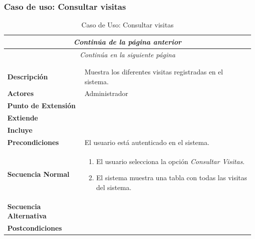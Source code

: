 \newpage
\subsubsection*{Caso de uso: Consultar visitas }
\begin{longtable}{| p{4cm} | p{10cm} |}
\endfirsthead
\multicolumn{2}{c}{\textit{Continúa de la página anterior}}\\[12pt]
\hline
\endhead
\hline
\multicolumn{2}{c}{\textit{Continúa en la siguiente página}} \\
\endfoot
\hline
\caption{Caso de Uso: Consultar visitas}\label{fig:1}\\
\endlastfoot


\hline
\multicolumn{2}{|c|}{\textbf{CU$<$31$>$ - Consultar Visitas}} \\

\hline
\textbf{Descripción} &
Muestra los diferentes visitas registradas en el sistema.\\

\hline
\textbf{Actores} &
Administrador\\

\hline
\textbf{Punto de Extensión} &
\\

\hline
\textbf{Extiende} &
\\

\hline
\textbf{Incluye} &
\\

\hline
\textbf{Precondiciones} &
El usuario está autenticado en el sistema.\\

\hline
\textbf{Secuencia Normal} &\mbox{}\par\vspace{-\baselineskip}
\begin{enumerate}[leftmargin=0.7cm, topsep=0.1cm]
\item El usuario selecciona la opción \textit{Consultar Visitas}.
\item El sistema muestra una tabla con todas las visitas del sistema.
\end{enumerate}


\\
\hline
\textbf{Secuencia Alternativa} &\mbox{}\par\vspace{-\baselineskip}
\\

\hline
\textbf{Postcondiciones} & \\
\hline
\end{longtable}



